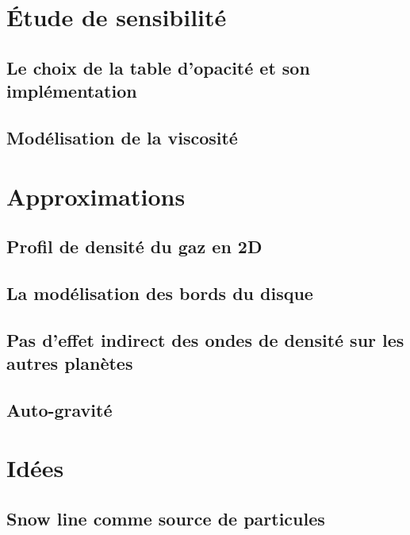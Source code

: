 \section{Étude de sensibilité}
\subsection{Le choix de la table d'opacité et son implémentation}

\subsection{Modélisation de la viscosité}



\section{Approximations}
\subsection{Profil de densité du gaz en 2D}
\subsection{La modélisation des bords du disque}
\subsection{Pas d'effet indirect des ondes de densité sur les autres planètes}
\subsection{Auto-gravité}

\section{Idées}
\subsection{Snow line comme source de particules}
